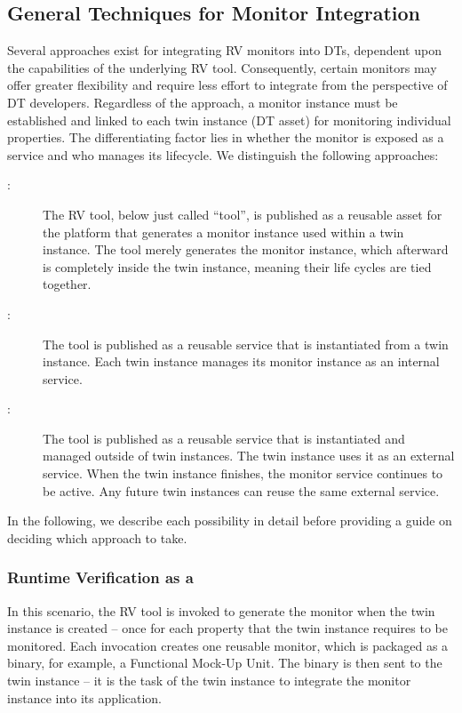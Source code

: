 \subsection{General Techniques for Monitor Integration}
Several approaches exist for integrating RV monitors into DTs, dependent upon the capabilities of the underlying RV tool.%
Consequently, certain monitors may offer greater flexibility and require less effort to integrate from the perspective of DT developers.
Regardless of the approach, a monitor instance must be established and linked to each twin instance (DT asset) for monitoring individual properties.
The differentiating factor lies in whether the monitor is exposed as a service and who manages its lifecycle.
We distinguish the following approaches:%
%
\begin{description}
	\item[\methodone:] The RV tool, below just called ``tool'', is published as a reusable asset for the platform that generates a monitor instance used within a twin instance.
		The tool merely generates the monitor instance, which afterward is completely inside the twin instance, meaning their life cycles are tied together.
	\item[\methodtwo:]
		The tool is published as a reusable service that is instantiated from a twin instance.
		Each twin instance manages its monitor instance as an internal service.
	\item[\methodthree:]
		The tool is published as a reusable service that is instantiated and managed outside of twin instances.
		The twin instance uses it as an external service.
		When the twin instance finishes, the monitor service continues to be active. Any future twin instances can reuse the same external service.
\end{description}

In the following, we describe each possibility in detail before providing a guide on deciding which approach to take.

\subsubsection{Runtime Verification as a \methodone}
In this scenario, the RV tool is invoked to generate the monitor when the twin instance is created -- once for each property that the twin instance requires to be monitored.
Each invocation creates one reusable monitor, which is packaged as a binary, for example, a Functional Mock-Up Unit. 
The binary is then sent to the twin instance -- it is the task of the twin instance to integrate the monitor instance into its application.

